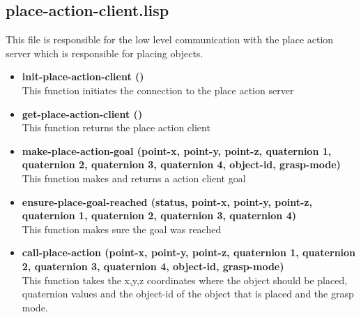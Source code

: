 \documentclass[main.tex]{subfiles}
\begin{document}
		\subsection{place-action-client.lisp}
		This file is responsible for the low level communication with the
		place action server which is responsible for placing objects.
	    \begin{itemize}
			\item \textbf{init-place-action-client ()} \\
			This function initiates the connection to the place action server
			\item \textbf{get-place-action-client ()} \\
			This function returns the place action client
			\item \textbf{make-place-action-goal (point-x, point-y, point-z, quaternion 1, quaternion 2, quaternion 3, quaternion 4, object-id, grasp-mode)} \\
			This function makes and returns a action client goal
			\item \textbf{ensure-place-goal-reached (status, point-x, point-y, point-z, quaternion 1, quaternion 2, quaternion 3, quaternion 4)} \\
            This function makes sure the goal was reached
			\item \textbf{call-place-action (point-x, point-y, point-z, quaternion 1, quaternion 2, quaternion 3, quaternion 4, object-id, grasp-mode)} \\
			This function takes the x,y,z coordinates where the object should be placed, quaternion values  and the object-id of the object that is placed and the grasp mode.
		\end{itemize}
\end{document}
